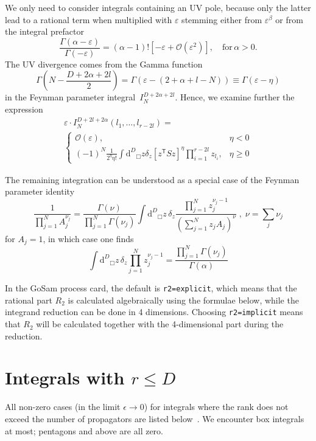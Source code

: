 \documentclass[11pt,a4paper]{refrep}
\newcommand{\gosam}{{\sc GoSam}\xspace}
\newcommand{\diff}[1][{}]{{\mathrm{d}}^{#1}\!}
\begin{document}
We only need to consider integrals containing an UV pole, because only the latter lead to
a rational term when multiplied with $\varepsilon$ stemming either from
$\varepsilon^\beta$ or from the integral prefactor
\begin{equation}
\frac{\Gamma(\alpha-\varepsilon)}{\Gamma(-\varepsilon)}=
(\alpha-1)!\left[-\varepsilon +{\mathcal O}(\varepsilon^2)\right],
\quad\text{for}\,\alpha>0.
\end{equation}
The UV divergence comes from the Gamma function
\begin{equation}
\Gamma\left(N-\frac{D+2\alpha+2l}2\right)=
\Gamma(\varepsilon-(2+\alpha+l-N))\equiv\Gamma(\varepsilon-\eta)
\end{equation}
in the Feynman parameter integral~$I_N^{D+2\alpha+2l}$.
Hence, we examine further the expression
\begin{multline}
\varepsilon\cdot I_N^{D+2l+2\alpha}(l_1,\ldots, l_{r-2l})=\\
\left\{\begin{array}{lr}
{\mathcal O}(\varepsilon),&\eta<0\\
(-1)^N\frac1{2^\eta\eta!}\int\diff[D]_\Box\!z\delta_z
\left[z^{\mathsf{T}}Sz\right]^\eta
\prod_{i=1}^{r-2l}z_{l_i},&\eta\geq0
\end{array}\right.
\end{multline}

The remaining integration can be understood as a special case of the
Feynman parameter identity
\begin{equation}
\frac{1}{\prod_{j=1}^N A_j^{\nu_j}}=\frac{\Gamma(\nu)}{
\prod_{j=1}^N \Gamma(\nu_j)}\int\!\diff[D]_\Box\!z\,\delta_z
\frac{\prod_{j=1}^N z_j^{\nu_j-1}}{\left(
\sum_{j=1}^N z_j A_j\right)^\nu}\; , \; \nu=\sum_j \nu_j
\end{equation}
for $A_j=1$, in which case one finds
\begin{equation}
\int\!\diff[D]_\Box\!z\,\delta_z
\prod_{j=1}^N z_j^{\nu_j-1}=\frac{\prod_{j=1}^N \Gamma(\nu_j)}%
{\Gamma(\alpha)}
\end{equation}

In the \gosam{} process card, the default is {\tt r2=explicit}, which means that
the rational part $R_2$ is calculated algebraically using the formulae below,
while the integrand reduction can be done in 4 dimensions.
Choosing {\tt r2=implicit} means that $R_2$ will be calculated together with the 4-dimensional
part during the reduction.

\section*{Integrals with \boldmath$r\leq D$}
All non-zero cases (in the limit $\epsilon\to0$) for
integrals where the rank does not exceed the number of propagators are listed
 below~\cite{Binoth:2006hk,Reiter:2009kb}. We encounter box integrals at most; pentagons and above are all zero.
\end{document}
